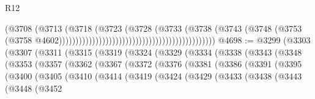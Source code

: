 \begin{lexlean}{R12}
\begin{coremodule}
{{{{{{{{{{{{{{{{{{{{{{{{{{{{{{{{{{{{{{{{{{{{{{{{{{{{{{{{{{{{{{{{{{{{{{{{{{{{{{{{{{                                                                            (@3708
                                                                              (@3713
                                                                                (@3718
                                                                                  (@3723
                                                                                    (@3728
                                                                                      (@3733
                                                                                        (@3738
                                                                                          (@3743
                                                                                            (@3748
                                                                                              (@3753
                                                                                                (@3758
                                                                                                  @4602)))))))))))))))))))))))))))))))))))))))))))))))
@4698 := @3299
    (@3303
      (@3307
        (@3311
          (@3315
            (@3319
              (@3324
                (@3329
                  (@3334
                    (@3338
                      (@3343
                        (@3348
                          (@3353
                            (@3357
                              (@3362
                                (@3367
                                  (@3372
                                    (@3376
                                      (@3381
                                        (@3386
                                          (@3391
                                            (@3395
                                              (@3400
                                                (@3405
                                                  (@3410
                                                    (@3414
                                                      (@3419
                                                        (@3424
                                                          (@3429
                                                            (@3433
                                                              (@3438
                                                                (@3443
                                                                  (@3448
                                                                    (@3452
}}}}}}}}}}}}}}}}}}}}}}}}}}}}}}}}}}}}}}}}}}}}}}}}}}}}}}}}}}}}}}}}}}}}}}}}}}}}}}}}}}
\end{coremodule}
\end{lexlean}
